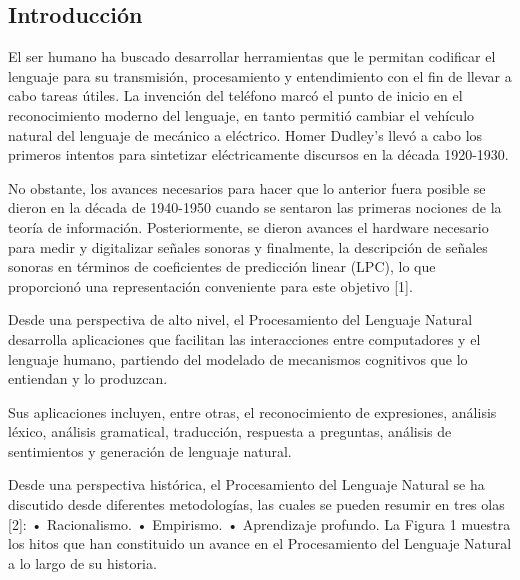 \documentclass[12pt, letterpaper]{article}
\begin{document}
    \begin{multicols}{2}
        \section*{Introducción}
            El ser humano ha buscado desarrollar herramientas que le permitan codificar el lenguaje para su transmisión, procesamiento y entendimiento 
            con el fin de llevar a cabo tareas útiles. La invención del teléfono marcó el punto de inicio en el reconocimiento moderno del lenguaje, 
            en tanto permitió cambiar el vehículo natural del lenguaje de mecánico a eléctrico. Homer Dudley’s llevó a cabo los primeros intentos para 
            sintetizar eléctricamente discursos en la década 1920-1930.

            No obstante, los avances necesarios para hacer que lo anterior fuera posible se dieron en la década de 1940-1950 cuando se sentaron las 
            primeras nociones de la teoría de información. Posteriormente, se dieron avances el hardware necesario para medir y digitalizar señales 
            sonoras y finalmente, la descripción de señales sonoras en términos de coeficientes de predicción linear (LPC), lo que proporcionó una 
            representación conveniente para este objetivo [1].

            Desde una perspectiva de alto nivel, el Procesamiento del Lenguaje Natural desarrolla aplicaciones que facilitan las interacciones entre 
            computadores y el lenguaje humano, partiendo del modelado de mecanismos cognitivos que lo entiendan y lo produzcan.

            Sus aplicaciones incluyen, entre otras, el reconocimiento de expresiones, análisis léxico, análisis gramatical, traducción, respuesta a 
            preguntas, análisis de sentimientos y generación de lenguaje natural.

            Desde una perspectiva histórica, el Procesamiento del Lenguaje Natural se ha discutido desde diferentes metodologías, las cuales se pueden 
            resumir en tres olas [2]:
                • Racionalismo.
                • Empirismo.
                • Aprendizaje profundo.
            La Figura 1 muestra los hitos que han constituido un avance en el Procesamiento del Lenguaje Natural a lo largo de su historia.        
    \end{multicols}
    
\end{document}
